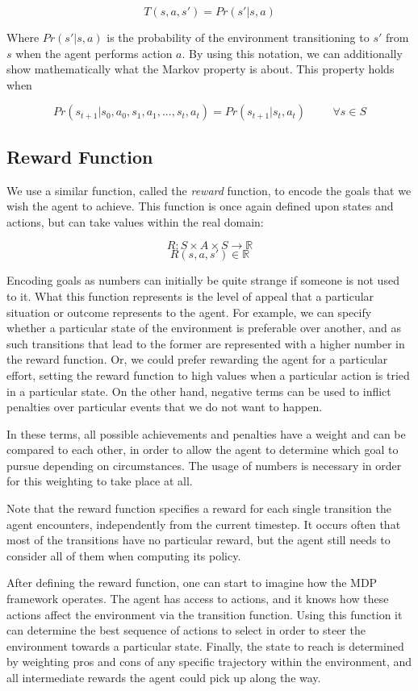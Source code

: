 \[ T(s, a, s') = Pr(s' | s, a) \]

Where $Pr(s'|s,a)$ is the probability of the environment transitioning to $s'$ from $s$ when the
agent performs action $a$. By using this notation, we can additionally show mathematically what the
Markov property is about. This property holds when

\[ Pr(s_{t+1} | s_{0}, a_{0}, s_{1}, a_{1}, ..., s_{t}, a_{t} ) = Pr(s_{t+1} | s_t, a_t ) \hspace{1cm} \forall s \in S \]

\subsection{Reward Function}

We use a similar function, called the \textit{reward} function, to encode the goals that we wish the
agent to achieve. This function is once again defined upon states and actions, but can take values
within the real domain:

\[ R: S\times A\times S \rightarrow \mathbb{R} \]
\[ R(s, a, s') \in \mathbb{R} \]

Encoding goals as numbers can initially be quite strange if someone is not used to it. What this
function represents is the level of appeal that a particular situation or outcome represents to the
agent. For example, we can specify whether a particular state of the environment is preferable over
another, and as such transitions that lead to the former are represented with a higher number in
the reward function. Or, we could prefer rewarding the agent for a particular effort, setting the
reward function to high values when a particular action is tried in a particular state. On the other
hand, negative terms can be used to inflict penalties over particular events that we do not want to
happen.

In these terms, all possible achievements and penalties have a weight and can be compared to each
other, in order to allow the agent to determine which goal to pursue depending on circumstances. The
usage of numbers is necessary in order for this weighting to take place at all.

Note that the reward function specifies a reward for each single transition the agent encounters,
independently from the current timestep. It occurs often that most of the transitions have no
particular reward, but the agent still needs to consider all of them when computing its policy.

After defining the reward function, one can start to imagine how the MDP framework operates. The
agent has access to actions, and it knows how these actions affect the environment via the
transition function. Using this function it can determine the best sequence of actions to select in
order to steer the environment towards a particular state. Finally, the state to reach is determined
by weighting pros and cons of any specific trajectory within the environment, and all intermediate
rewards the agent could pick up along the way.

